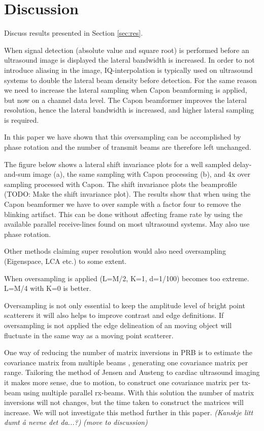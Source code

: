 \documentclass[journal]{IEEEtran}
\newcommand\comment[1]{\textit{{\color{red}(#1)}}}
\begin{document}
\section{Discussion}\label{sec:dis}
Discuss results presented in Section \ref{sec:res}.

When signal detection (absolute value and square root) is performed before an ultrasound image is displayed the lateral bandwidth is increased. In order to not introduce aliasing in the image, IQ-interpolation is typically used on ultrasound systems to double the lateral beam density before detection. For the same reason we need to increase the lateral sampling when Capon beamforming is applied, but now on a channel data level. The Capon beamformer improves the lateral resolution, hence the lateral bandwidth is increased, and higher lateral sampling is required. 

In this paper we have shown that this oversampling can be accomplished by phase rotation and the number of transmit beams are therefore left unchanged. 

The figure below shows a lateral shift invariance plots for a well sampled delay-and-sum image (a), the same sampling with Capon processing (b), and 4x over sampling processed with Capon. The shift invariance plots the beamprofile (TODO: Make the shift invariance plot). The results show that when using the Capon beamformer we have to over sample with a factor four to remove the blinking artifact. This can be done without affecting frame rate by using the available parallel receive-lines found on most ultrasound systems. May also use phase rotation. 

Other methods claiming super resolution would also need oversampling (Eigenspace, LCA etc.) to some extent. 

When oversampling is applied (L=M/2, K=1, d=1/100) becomes too extreme. L=M/4 with K=0 is better. 

Oversampling is not only essential to keep the amplitude level of bright point scatterers it will also helps to improve contrast and edge definitions. If oversampling is not applied the edge delineation of an moving object will fluctuate in the same way as a moving point scatterer. 

One way of reducing the number of matrix inversions in PRB is to estimate the covariance matrix from multiple beams \cite{Jensen2012}, generating one covariance matrix per range.  Tailoring the method of Jensen and Austeng to cardiac ultrasound imaging it makes more sense, due to motion, to construct one covariance matrix per tx-beam using multiple parallel rx-beams. With this solution the number of matrix inversions will not changes, but the time taken to construct the matrices will increase. We will not investigate this method further in this paper. \comment{Kanskje litt dumt å nevne det da...?} \comment{move to discussion}
\end{document}
